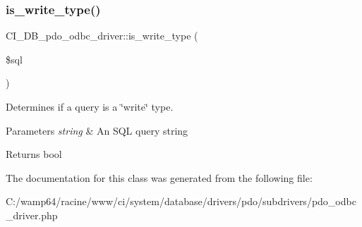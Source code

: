 \subsubsection{\texorpdfstring{is\+\_\+write\+\_\+type()}{is\_write\_type()}}
{\footnotesize\ttfamily C\+I\+\_\+\+D\+B\+\_\+pdo\+\_\+odbc\+\_\+driver\+::is\+\_\+write\+\_\+type (\begin{DoxyParamCaption}\item[{}]{\$sql }\end{DoxyParamCaption})}

Determines if a query is a \char`\"{}write\char`\"{} type.


\begin{DoxyParams}{Parameters}
{\em string} & An S\+QL query string \\
\hline
\end{DoxyParams}
\begin{DoxyReturn}{Returns}
bool 
\end{DoxyReturn}


The documentation for this class was generated from the following file\+:\begin{DoxyCompactItemize}
\item 
C\+:/wamp64/racine/www/ci/system/database/drivers/pdo/subdrivers/pdo\+\_\+odbc\+\_\+driver.\+php\end{DoxyCompactItemize}
